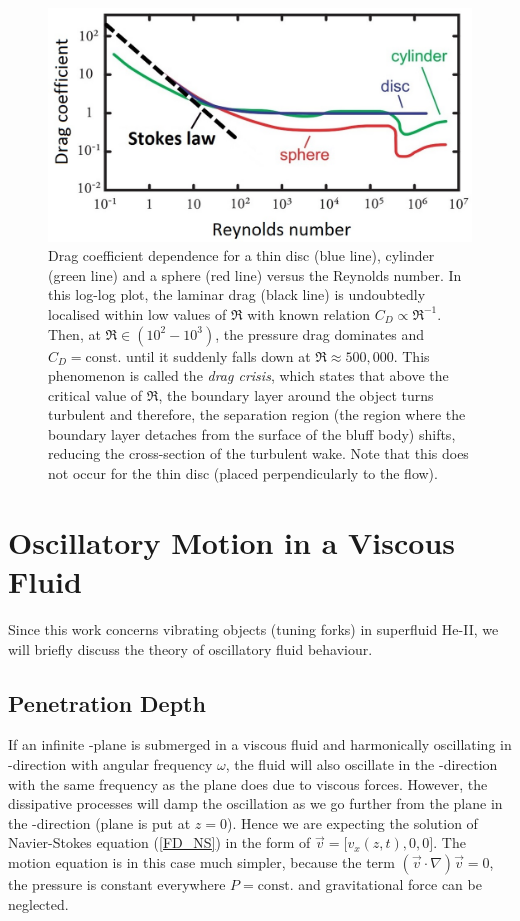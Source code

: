 \begin{figure}[h]
\centering
\includegraphics[scale=0.4]{graphics/dragcoeff}
\caption{Drag coefficient dependence for a thin disc (blue line), cylinder (green line) and a sphere (red line) versus the Reynolds number. In this log-log plot, the laminar drag (black line) is undoubtedly localised within low values of $\Re$ with known relation $C_D \!\propto\! \Re^{-1}$. Then, at $\Re \in (10^2-10^3)$, the pressure drag dominates and $C_D=\text{const.}$ until it suddenly falls down at $\Re \approx 500,000$. This phenomenon is called the \textit{drag crisis}, which states that above the critical value of $\Re$, the boundary layer around the object turns turbulent and therefore, the separation region (the region where the boundary layer detaches from the surface of the bluff body) shifts, reducing the cross-section of the turbulent wake. Note that this does not occur for the thin disc (placed perpendicularly to the flow).}
\end{figure}



\section{Oscillatory Motion in a Viscous Fluid}

Since this work concerns vibrating objects (tuning forks) in superfluid He-II, we will briefly discuss the theory of oscillatory fluid behaviour.

\subsection*{Penetration Depth}

If an infinite -plane is submerged in a viscous fluid and harmonically oscillating in -direction with angular frequency $\omega$, the fluid will also oscillate in the -direction with the same frequency as the plane does due to viscous forces. However, the dissipative processes will damp the oscillation as we go further from the plane in the -direction (plane is put at $z=0$). Hence we are expecting the solution of Navier-Stokes equation (\ref{FD_NS}) in the
form of $ \vec{v} = \big[ v_x(z,t), 0, 0 \big] $. The motion equation is in this case much simpler, because the term $ (\vec{v}\cdot \nabla)\vec{v} = 0 $, the pressure is constant everywhere $ P=\text{const.} $ and gravitational force
can be neglected.

